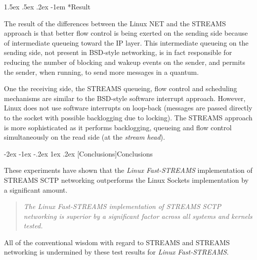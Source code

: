 \documentclass[letterpaper,final,notitlepage,twocolumn,10pt,twoside]{article}
\makeatletter
\renewcommand\section{\@startsection {section}{1}{\z@}%
                                   {-2ex \@plus -1ex \@minus -.2ex}%
                                   {1ex \@plus .2ex}%
                                   {\normalfont\large\bfseries}}
\renewcommand\paragraph{\@startsection{paragraph}{4}{\z@}%
                                    {1.5ex \@plus .5ex \@minus .2ex}%
                                    {-1em}%
                                    {\normalfont\normalsize\bfseries\slshape}}
\makeatother
\begin{document}
\paragraph*{Result}

The result of the differences between the Linux NET and the STREAMS approach
is that better flow control is being exerted on the sending side because of
intermediate queueing toward the IP layer.  This intermediate queueing on the
sending side, not present in BSD-style networking, is in fact responsible for
reducing the number of blocking and wakeup events on the sender, and permits
the sender, when running, to send more messages in a quantum.

One the receiving side, the STREAMS queueing, flow control and scheduling
mechanisms are similar to the BSD-style software interrupt approach.  However,
Linux does not use software interrupts on loop-back (messages are passed
directly to the socket with possible backlogging due to locking).  The STREAMS
approach is more sophisticated as it performs backlogging, queueing and flow
control simultaneously on the read side (at the \textit{stream head}).


\section[Conclusions]{Conclusions}

These experiments have shown that the \textsl{Linux Fast-STREAMS}
implementation of STREAMS SCTP networking outperforms the Linux Sockets
implementation by a significant amount.

\begin{quote}
\textit{The \textsl{Linux Fast-STREAMS} implementation of STREAMS SCTP
networking is superior by a significant factor across all systems and kernels
tested.}
\end{quote}

All of the conventional wisdom with regard to STREAMS and STREAMS networking
is undermined by these test results for \textsl{Linux Fast-STREAMS}.
\end{document}
